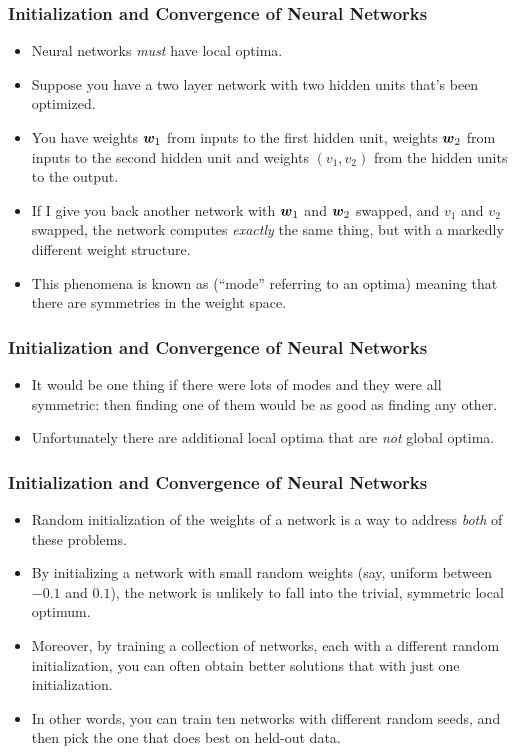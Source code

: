 \documentclass[trans]{beamer}
\begin{document}
\begin{frame}
  \frametitle{Initialization and Convergence of Neural Networks}
\begin{itemize}
\item Neural networks \emph{must} have
local optima.  
\item Suppose you have a two layer network with two hidden
units that's been optimized. 
\item You have weights ${\boldsymbol{w}}_1$ from inputs to
the first hidden unit, weights ${\boldsymbol{w}}_2$ from inputs to the second
hidden unit and weights $(v_1,v_2)$ from the hidden units to the
output.
\item  If I give you back another network with ${\boldsymbol{w}}_1$ and ${\boldsymbol{w}}_2$
swapped, and $v_1$ and $v_2$ swapped, the network computes
\emph{exactly} the same thing, but with a markedly different weight
structure. 
\item This phenomena is known as 
(``mode'' referring to an optima) meaning that there are symmetries in
the weight space. 
\end{itemize}
\end{frame}

\begin{frame}
  \frametitle{Initialization and Convergence of Neural Networks}
\begin{itemize}
\item  It would be one thing if there were lots of modes
and they were all symmetric: then finding one of them would be as good
as finding any other.
\item  Unfortunately there are additional local
optima that are \emph{not} global optima.
\end{itemize}
\end{frame}

\begin{frame}
  \frametitle{Initialization and Convergence of Neural Networks}
\begin{itemize}
\item
Random initialization of the weights of a network is a way to address
\emph{both} of these problems.  
\item By initializing a network with small
random weights (say, uniform between $-0.1$ and $0.1$), the network is
unlikely to fall into the trivial, symmetric local optimum.  
\item Moreover,
by training a collection of networks, each with a different random
initialization, you can often obtain better solutions that with just
one initialization. 
\item In other words, you can train ten networks with
different random seeds, and then pick the one that does best on
held-out data. 
\end{itemize}
\end{frame}
\end{document}
